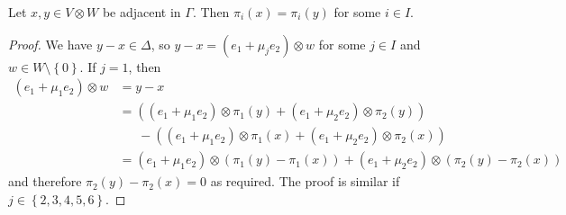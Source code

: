 \documentclass[ALCO, Unicode]{cedram}
\begin{document}
\begin{lemma} \label{lm:adjacency-implies-clique}
Let $x, y \in V \otimes W$ be adjacent in $\Gamma$. Then $\pi_i{\left(x \right)} = \pi_i{\left(y \right)}$ for some $i \in I$.
\end{lemma}
\begin{proof}
We have $y-x \in \Delta$, so $y-x = \left(e_1 + \mu_j e_2 \right) \otimes w$ for some $j \in I$ and $w \in W \setminus \left\{0 \right\}$. If $j=1$, then
\begin{align*}
    \left(e_1 + \mu_1 e_2 \right) \otimes w &= y-x \\
    &= \left(\left(e_1 + \mu_1 e_2 \right) \otimes \pi_1{\left(y \right)} + \left(e_1 + \mu_2 e_2 \right) \otimes \pi_2{\left(y \right)}\right) \\
    &\ \ \ \ \ \ \ - \left(\left(e_1 + \mu_1 e_2 \right) \otimes \pi_1{\left(x \right)} + \left(e_1 + \mu_2 e_2 \right) \otimes \pi_2{\left(x \right)}\right) \\
    &= \left(e_1 + \mu_1 e_2 \right) \otimes \left(\pi_1{\left(y \right)} - \pi_1{\left(x \right)}\right) + \left(e_1 + \mu_2 e_2 \right) \otimes \left(\pi_2{\left(y \right)} - \pi_2{\left(x \right)}\right)
\end{align*}
and therefore $\pi_2{\left(y \right)} - \pi_2{\left(x \right)} = 0$ as required. The proof is similar if $j \in \left\{2, 3, 4, 5, 6 \right\}$.
\end{proof}
\end{document}
